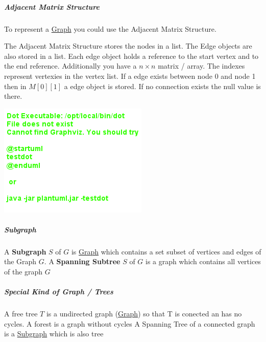 \documentclass[11pt,twoside,twocolumn,landscape]{article}
\begin{document}
\subparagraph{Adjacent Matrix Structure}
\label{sec:orgcb3aa91}

To represent a \href{../../../roam/20220201163000-graph.org}{Graph} you could use the Adjacent Matrix Structure.

The Adjacent Matrix Structure stores the nodes in a list.
The Edge objects are also stored in a list.
Each edge object holds a reference to the start vertex and to the end reference.
Additionally you have a \(n \times n\) matrix / array.
The indexes represent vertexies in the vertex list.
If a edge exists between node 0 and node 1 then in \(M[0][1]\) a edge object is stored.
If no connection exists the null value is there. 



\begin{center}
\includegraphics[width=.9\linewidth]{img/adjacent_matrix_structure.png}
\end{center}

\subparagraph{Subgraph}
\label{sec:org226610f}

A \textbf{Subgraph} \(S\) of \(G\) is \href{../../../roam/20220201163000-graph.org}{Graph} which contains a set subset of vertices and edges of the Graph \(G\).
A \textbf{Spanning Subtree} \(S\) of \(G\) is a graph which contains all vertices of the graph \(G\)

\subparagraph{Special Kind of Graph / Trees}
\label{sec:org700ae9e}

A free tree \(T\) is a undirected graph (\href{../../../roam/20220201163000-graph.org}{Graph}) so that T is conected an has no cycles.
A forest is a graph without cycles
A Spanning Tree of a connected graph is a \href{../../../roam/20220201181419-subgraph.org}{Subgraph} which is also tree
\end{document}
